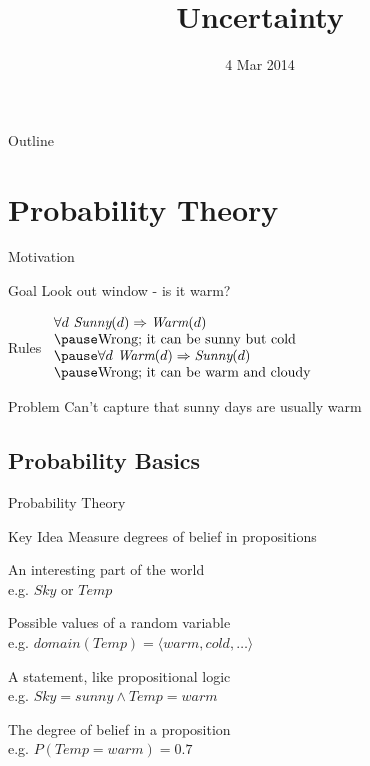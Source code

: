 \documentclass[14pt]{beamer}
\title{Uncertainty}
\date{4 Mar 2014}
\begin{document}
\begin{frame}
\titlepage
\end{frame}

\begin{frame}{Outline}
\tableofcontents
\end{frame}

\section{Probability Theory}
\begin{frame}{Motivation}
	\begin{block}{Goal}
		Look out window - is it warm?
	\end{block}
	\pause
	\begin{block}{Rules}
		$
		\begin{array}{l}
			\forall d\ \textit{Sunny}(d) \Rightarrow \textit{Warm}(d) \\
			\pause \mbox{Wrong; it can be sunny but cold} \\
			\pause \forall d\ \textit{Warm}(d) \Rightarrow \textit{Sunny}(d) \\
			\pause\mbox{Wrong; it can be warm and cloudy} \\
		\end{array}
		$
	\end{block}
	\pause
	\begin{block}{Problem}
		Can't capture that sunny days are usually warm
	\end{block}
\end{frame}


\subsection{Probability Basics}

\begin{frame}{Probability Theory}
\begin{block}{Key Idea}
Measure degrees of belief in propositions
\end{block}
\bigskip
\begin{description}
\pause
\item[Random Variable]
An interesting part of the world \\
e.g. $\textit{Sky}$ or $\textit{Temp}$
\pause
\item[Domain]
Possible values of a random variable \\
e.g. $\textit{domain}(\textit{Temp})=\langle\textit{warm}, \textit{cold}, \ldots\rangle$
\pause
\item[Proposition]
A statement, like propositional logic \\
e.g. $\textit{Sky} = \textit{sunny} \land \textit{Temp} = \textit{warm}$
\pause
\item[Probability]
The degree of belief in a proposition \\
e.g. $P(\textit{Temp} = \textit{warm}) = 0.7$
\end{description}
\end{frame}
\end{document}
